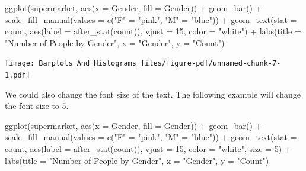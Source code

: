 \documentclass[
  letterpaper,
  DIV=11,
  numbers=noendperiod]{scrreprt}
\newenvironment{Shaded}{\begin{snugshade}}{\end{snugshade}}
\newcommand{\AttributeTok}[1]{\textcolor[rgb]{0.40,0.45,0.13}{#1}}
\newcommand{\DecValTok}[1]{\textcolor[rgb]{0.68,0.00,0.00}{#1}}
\newcommand{\FunctionTok}[1]{\textcolor[rgb]{0.28,0.35,0.67}{#1}}
\newcommand{\NormalTok}[1]{\textcolor[rgb]{0.00,0.23,0.31}{#1}}
\newcommand{\OtherTok}[1]{\textcolor[rgb]{0.00,0.23,0.31}{#1}}
\newcommand{\SpecialCharTok}[1]{\textcolor[rgb]{0.37,0.37,0.37}{#1}}
\newcommand{\StringTok}[1]{\textcolor[rgb]{0.13,0.47,0.30}{#1}}
\begin{document}
\begin{Shaded}
\begin{Highlighting}[]
\FunctionTok{ggplot}\NormalTok{(supermarket, }\FunctionTok{aes}\NormalTok{(}\AttributeTok{x =}\NormalTok{ Gender, }\AttributeTok{fill =}\NormalTok{ Gender)) }\SpecialCharTok{+}
  \FunctionTok{geom\_bar}\NormalTok{() }\SpecialCharTok{+}
  \FunctionTok{scale\_fill\_manual}\NormalTok{(}\AttributeTok{values =} \FunctionTok{c}\NormalTok{(}\StringTok{"F"} \OtherTok{=} \StringTok{"pink"}\NormalTok{, }\StringTok{"M"} \OtherTok{=} \StringTok{"blue"}\NormalTok{)) }\SpecialCharTok{+}
  \FunctionTok{geom\_text}\NormalTok{(}\AttributeTok{stat =} \StringTok{\textquotesingle{}count\textquotesingle{}}\NormalTok{, }\FunctionTok{aes}\NormalTok{(}\AttributeTok{label =} \FunctionTok{after\_stat}\NormalTok{(count)), }\AttributeTok{vjust =} \DecValTok{15}\NormalTok{, }\AttributeTok{color =} \StringTok{"white"}\NormalTok{) }\SpecialCharTok{+}
  \FunctionTok{labs}\NormalTok{(}\AttributeTok{title =} \StringTok{"Number of People by Gender"}\NormalTok{,}
       \AttributeTok{x =} \StringTok{"Gender"}\NormalTok{,}
       \AttributeTok{y =} \StringTok{"Count"}\NormalTok{)}
\end{Highlighting}
\end{Shaded}

\texttt{[image: Barplots\_And\_Histograms\_files/figure-pdf/unnamed-chunk-7-1.pdf]}

We could also change the font size of the text. The following example
will change the font size to 5.

\begin{Shaded}
\begin{Highlighting}[]
\FunctionTok{ggplot}\NormalTok{(supermarket, }\FunctionTok{aes}\NormalTok{(}\AttributeTok{x =}\NormalTok{ Gender, }\AttributeTok{fill =}\NormalTok{ Gender)) }\SpecialCharTok{+}
  \FunctionTok{geom\_bar}\NormalTok{() }\SpecialCharTok{+}
  \FunctionTok{scale\_fill\_manual}\NormalTok{(}\AttributeTok{values =} \FunctionTok{c}\NormalTok{(}\StringTok{"F"} \OtherTok{=} \StringTok{"pink"}\NormalTok{, }\StringTok{"M"} \OtherTok{=} \StringTok{"blue"}\NormalTok{)) }\SpecialCharTok{+}
  \FunctionTok{geom\_text}\NormalTok{(}\AttributeTok{stat =} \StringTok{\textquotesingle{}count\textquotesingle{}}\NormalTok{, }\FunctionTok{aes}\NormalTok{(}\AttributeTok{label =} \FunctionTok{after\_stat}\NormalTok{(count)), }\AttributeTok{vjust =} \DecValTok{15}\NormalTok{, }\AttributeTok{color =} \StringTok{"white"}\NormalTok{, }\AttributeTok{size =} \DecValTok{5}\NormalTok{) }\SpecialCharTok{+}
  \FunctionTok{labs}\NormalTok{(}\AttributeTok{title =} \StringTok{"Number of People by Gender"}\NormalTok{,}
       \AttributeTok{x =} \StringTok{"Gender"}\NormalTok{,}
       \AttributeTok{y =} \StringTok{"Count"}\NormalTok{)}
\end{Highlighting}
\end{Shaded}
\end{document}
